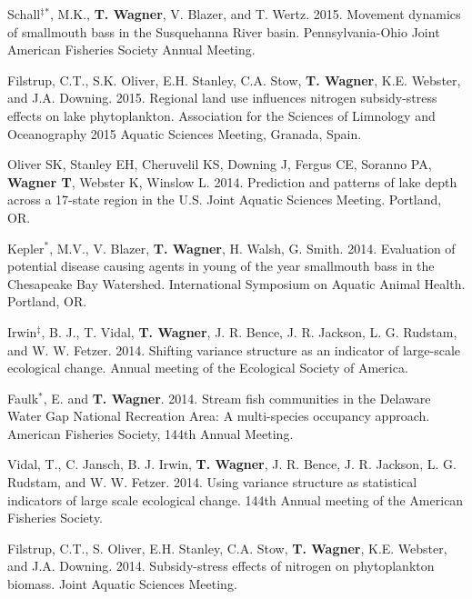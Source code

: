 \documentclass[10pt]{article}
\begin{document}
\begin{flushleft}
\begin{etaremune}
\item Schall$^\ddagger$$^*$, M.K.,  {\bf T. Wagner}, V. Blazer, and T. Wertz. 2015. Movement dynamics of smallmouth bass in the Susquehanna River basin. Pennsylvania-Ohio Joint American Fisheries Society Annual Meeting.

\item Filstrup, C.T., S.K. Oliver, E.H. Stanley, C.A. Stow, {\bf T. Wagner}, K.E. Webster, and J.A. Downing. 2015. Regional land use influences nitrogen subsidy-stress effects on lake phytoplankton. Association for the Sciences of Limnology and Oceanography 2015 Aquatic Sciences Meeting, Granada, Spain. 


\item Oliver SK, Stanley EH, Cheruvelil KS, Downing J, Fergus CE, Soranno PA, {\bf Wagner T}, Webster K, Winslow L. 2014. Prediction and patterns of lake depth across a 17-state region in the U.S. Joint Aquatic Sciences Meeting. Portland, OR.

\item Kepler$^*$, M.V., V. Blazer, {\bf T. Wagner}, H. Walsh, G. Smith. 2014. Evaluation of potential disease causing agents in young of the year smallmouth bass in the Chesapeake Bay Watershed. International Symposium on Aquatic Animal Health. Portland, OR. 

\item Irwin$^\ddagger$, B. J., T. Vidal, {\bf T. Wagner}, J. R. Bence, J. R. Jackson, L. G. Rudstam, and W. W. Fetzer. 2014. Shifting variance structure as an indicator of large-scale ecological change. Annual meeting of the Ecological Society of America.

\item Faulk$^*$, E. and {\bf T. Wagner}. 2014. Stream fish communities in the Delaware Water Gap National Recreation Area: A multi-species occupancy approach. American Fisheries Society, 144th Annual Meeting.

\item Vidal, T., C. Jansch, B. J. Irwin, {\bf T. Wagner}, J. R. Bence, J. R. Jackson, L. G. Rudstam, and W. W. Fetzer. 2014. Using variance structure as statistical indicators of large scale ecological change. 144th Annual meeting of the American Fisheries Society.  

\item Filstrup, C.T., S. Oliver, E.H. Stanley, C.A. Stow, {\bf T. Wagner}, K.E. Webster, and J.A. Downing. 2014. Subsidy-stress effects of nitrogen on phytoplankton biomass. Joint Aquatic Sciences Meeting. 


\end{etaremune}
\end{flushleft}
\end{document}
